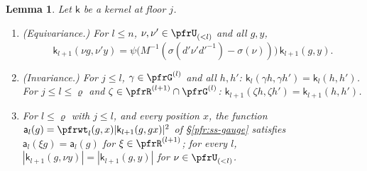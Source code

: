 \documentclass[10pt]{amsart}
\newtheorem{lemma}[theorem]{Lemma}
\theoremstyle{definition}
\theoremstyle{remark}
\begin{document}
\begin{lemma}\label{pfs:kernels}
Let $\mathsf k$ be a kernel at floor $j$.
\begin{enumerate}
\item[(K1)] \textup{(Equivariance.)} For $l\le n$, $\nu,\nu'\in\pfrU_{(<l)}$ and all $g,y$,
\[
\mathsf k_{l+1}(\nu g,\nu'y)=\psi\bigl(M^{-1}(\sigma(d'\nu'd'^{-1})-\sigma(\nu))\bigr)\,\mathsf k_{l+1}(g,y).
\]
\item[(K2)] \textup{(Invariance.)} For $j\le l$, $\gamma\in\pfrG^{(l)}$ and all $h,h'$:
$\mathsf k_l(\gamma h,\gamma h')=\mathsf k_l(h,h')$. For $j\le l\le\varrho$ and $\zeta\in\pfrR^{(l+1)}\cap\pfrG^{(l)}$:
$\mathsf k_{l+1}(\zeta h,\zeta h')=\mathsf k_{l+1}(h,h')$.
\item[(K3)] For $l\le\varrho$ with $j\le l$, and every position $x$, the function
$\mathsf a_l(g)=\pfrwt_l(g,x)|\mathsf k_{l+1}(g,gx)|^2$ of \S\ref{pfr:ss-gauge} satisfies $\mathsf a_l(\xi g)=\mathsf
a_l(g)$ for $\xi\in\pfrR^{(l+1)}$; for every $l$, $|\mathsf k_{l+1}(g,\nu y)|=|\mathsf k_{l+1}(g,y)|$ for
$\nu\in\pfrU_{(<l)}$.
\end{enumerate}
\end{lemma}
\end{document}
